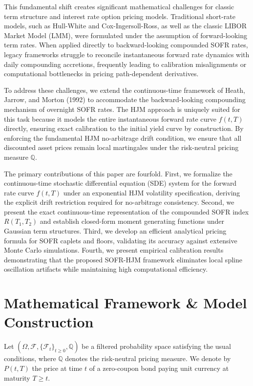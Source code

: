 \documentclass[11pt,a4paper]{article}
\begin{document}
This fundamental shift creates significant mathematical challenges for classic term structure and interest rate option pricing models. Traditional short-rate models, such as Hull-White and Cox-Ingersoll-Ross, as well as the classic LIBOR Market Model (LMM), were formulated under the assumption of forward-looking term rates. When applied directly to backward-looking compounded SOFR rates, legacy frameworks struggle to reconcile instantaneous forward rate dynamics with daily compounding accretions, frequently leading to calibration misalignments or computational bottlenecks in pricing path-dependent derivatives.

To address these challenges, we extend the continuous-time framework of Heath, Jarrow, and Morton (1992) to accommodate the backward-looking compounding mechanism of overnight SOFR rates. The HJM approach is uniquely suited for this task because it models the entire instantaneous forward rate curve $f(t, T)$ directly, ensuring exact calibration to the initial yield curve by construction. By enforcing the fundamental HJM no-arbitrage drift condition, we ensure that all discounted asset prices remain local martingales under the risk-neutral pricing measure $\mathbb{Q}$.

The primary contributions of this paper are fourfold. First, we formalize the continuous-time stochastic differential equation (SDE) system for the forward rate curve $f(t, T)$ under an exponential HJM volatility specification, deriving the explicit drift restriction required for no-arbitrage consistency. Second, we present the exact continuous-time representation of the compounded SOFR index $R(T_1, T_2)$ and establish closed-form moment generating functions under Gaussian term structures. Third, we develop an efficient analytical pricing formula for SOFR caplets and floors, validating its accuracy against extensive Monte Carlo simulations. Fourth, we present empirical calibration results demonstrating that the proposed SOFR-HJM framework eliminates local spline oscillation artifacts while maintaining high computational efficiency.

\section{Mathematical Framework \& Model Construction}

Let $(\Omega, \mathcal{F}, \{\mathcal{F}_t\}_{t \ge 0}, \mathbb{Q})$ be a filtered probability space satisfying the usual conditions, where $\mathbb{Q}$ denotes the risk-neutral pricing measure. We denote by $P(t, T)$ the price at time $t$ of a zero-coupon bond paying unit currency at maturity $T \ge t$.
\end{document}
